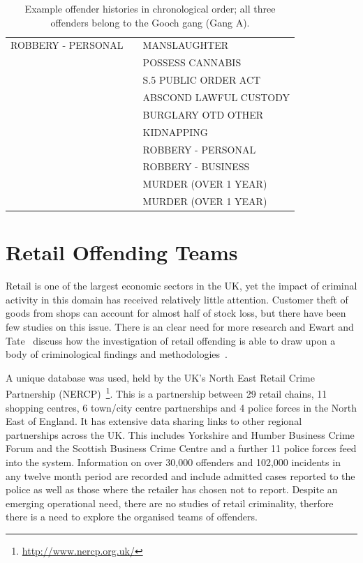 \documentclass[conference]{IEEEtran}
\theoremstyle{definition}
\begin{document}
\begin{table}[!ht]
{\begin{tabular}{lll}
    ROBBERY - PERSONAL   &       & MANSLAUGHTER           \\
          &       & POSSESS CANNABIS       \\
          &       & S.5 PUBLIC ORDER ACT   \\
          &       & ABSCOND LAWFUL CUSTODY \\
          &       & BURGLARY OTD OTHER     \\
          &       & KIDNAPPING             \\
          &       & ROBBERY - PERSONAL     \\
          &       & ROBBERY - BUSINESS     \\
          &       & MURDER (OVER 1 YEAR)   \\
          &       & MURDER (OVER 1 YEAR)   \\
    \end{tabular}}
 \caption{Example offender histories in chronological order; all three offenders belong to
   the Gooch gang (Gang A).}
  \label{tab:histories}
\end{table}


\section{Retail Offending Teams}\label{sec:retail}
Retail is one of the largest economic sectors in the UK, yet the
impact of criminal activity in this domain has received relatively
little attention.  Customer theft of goods from shops can account for
almost half of stock loss, but there have been few studies on this
issue. There is an clear need for more research and Ewart and
Tate~\cite{EwartTate2007} discuss how the investigation of retail
offending is able to draw upon a body of criminological findings and
methodologies~\cite{Bamfield2006}.

A unique database was used, held by the UK's North East Retail Crime
Partnership (NERCP)~\footnote{\url{http://www.nercp.org.uk/}}.  This
is a partnership between 29 retail chains, 11 shopping centres, 6
town/city centre partnerships and 4 police forces in the North East of
England.  It has extensive data sharing links to other regional
partnerships across the UK.  This includes Yorkshire and Humber
Business Crime Forum and the Scottish Business Crime Centre and a
further 11 police forces feed into the system. Information on over
30,000 offenders and 102,000 incidents in any twelve month period are
recorded and include admitted cases reported to the police as well as
those where the retailer has chosen not to report. Despite an emerging
operational need, there are no studies of retail criminality, therfore
there is a need to explore the organised teams of offenders.
\end{document}
